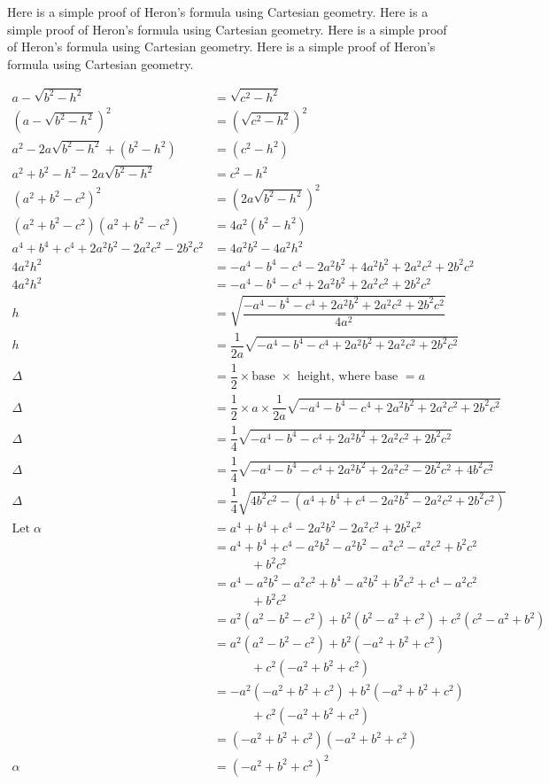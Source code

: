 \documentclass[
]{book}
\begin{document}
Here is a simple proof of Heron's formula using Cartesian geometry.
Here is a simple proof of Heron's formula using Cartesian geometry.
Here is a simple proof of Heron's formula using Cartesian geometry.
Here is a simple proof of Heron's formula using Cartesian geometry.

\[
\begin{aligned}
a - \sqrt{b^2 - h^2} &= \sqrt{c^2 - h^2} \\
(a - \sqrt{b^2 - h^2})^2 &= (\sqrt{c^2 - h^2})^2 \\
a^2 - 2a\sqrt{b^2 - h^2} + (b^2 - h^2) &= (c^2 - h^2) \\
a^2 + b^2 - h^2 - 2a\sqrt{b^2 - h^2} &= c^2 - h^2 \\
(a^2 + b^2 - c^2)^2 &= (2a\sqrt{b^2 - h^2})^2 \\
(a^2 + b^2 - c^2)(a^2 + b^2 - c^2) &= 4a^2(b^2 - h^2) \\
a^4 + b^4 + c^4 + 2a^2b^2 - 2a^2c^2 - 2b^2c^2 &= 4a^2b^2 - 4a^2h^2 \\
4a^2h^2 &= -a^4 - b^4 - c^4 - 2a^2b^2 + 4a^2b^2 + 2a^2c^2 + 2b^2c^2 \\
4a^2h^2 &= -a^4 - b^4 - c^4 + 2a^2b^2 + 2a^2c^2 + 2b^2c^2 \\
h &= \sqrt{\dfrac{-a^4 - b^4 - c^4 + 2a^2b^2 + 2a^2c^2 + 2b^2c^2}{4a^2}} \\
h &= \dfrac{1}{2a} \sqrt{-a^4 - b^4 - c^4 + 2a^2b^2 + 2a^2c^2 + 2b^2c^2} \\
\Delta &= \dfrac{1}{2} \times \text{base $\times$ height, where base $= a$} \\
\Delta &= \dfrac{1}{2} \times a \times \dfrac{1}{2a} \sqrt{-a^4 - b^4 - c^4 + 2a^2b^2 + 2a^2c^2 + 2b^2c^2} \\
\Delta &= \dfrac{1}{4} \sqrt{-a^4 - b^4 - c^4 + 2a^2b^2 + 2a^2c^2 + 2b^2c^2} \\
\Delta &= \dfrac{1}{4} \sqrt{-a^4 - b^4 - c^4 + 2a^2b^2 + 2a^2c^2 - 2b^2c^2 + 4b^2c^2} \\
\Delta &= \dfrac{1}{4} \sqrt{4b^2c^2 - (a^4 + b^4 + c^4 - 2a^2b^2 - 2a^2c^2 + 2b^2c^2)} \\
\text{Let}\; \alpha &= a^4 + b^4 + c^4 - 2a^2b^2 - 2a^2c^2 + 2b^2c^2 \\
&= a^4 + b^4 + c^4 - a^2b^2 - a^2b^2 - a^2c^2 - a^2c^2 + b^2c^2 \\
    &\qquad\quad + b^2c^2 \\
&= a^4 - a^2b^2 - a^2c^2 + b^4 - a^2b^2 + b^2c^2 + c^4 - a^2c^2 \\
    &\qquad\quad + b^2c^2 \\
&= a^2(a^2 - b^2 - c^2) + b^2(b^2 - a^2 + c^2) + c^2(c^2 - a^2 + b^2) \\
&= a^2(a^2 - b^2 - c^2) + b^2(-a^2 + b^2 + c^2) \\
        &\qquad\quad + c^2(-a^2 + b^2 + c^2) \\
&= -a^2(-a^2 + b^2 + c^2) + b^2(-a^2 + b^2 + c^2) \\
        &\qquad\quad + c^2(-a^2 + b^2 + c^2) \\
&= (-a^2 + b^2 + c^2)(-a^2 + b^2 + c^2) \\
\alpha &= (-a^2 + b^2 + c^2)^2
\end{aligned}
\]
\end{document}
